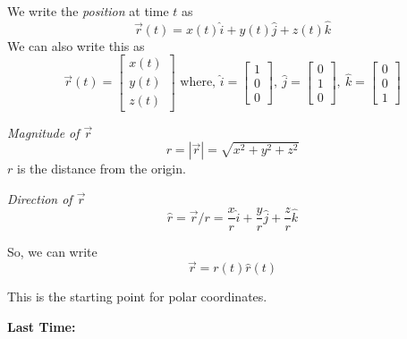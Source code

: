 \documentclass[10pt]{scrartcl}
\begin{document}
\begin{definition} We write the \emph{position} at time $t$ as
\[\vec{r}(t) = x(t)\hat{i} + y(t)\hat{j} + z(t)\hat{k}\]
We can also write this as
\[\vec{r}(t) = \left[\begin{smallmatrix}
x(t)\\ y(t) \\ z(t)	
\end{smallmatrix}
 \right]\text{ where, } \hat{i} =  \left[\begin{smallmatrix}
1\\0\\0
\end{smallmatrix}
 \right],~ \hat{j} =  \left[\begin{smallmatrix}
0\\1\\0
\end{smallmatrix}
 \right],~ \hat{k} =  \left[\begin{smallmatrix}
0\\0\\1
\end{smallmatrix}
 \right]\]
\end{definition}
\begin{definition}
 \textit{Magnitude of $\vec{r}$} \[r = |\vec{r}| = \sqrt{x^2 + y^2 + z^2}\]
$r$ is the distance from the origin.
 
 \textit{Direction of $\vec{r}$} \[\hat{r} = \vec{r}/r = \frac{x}{r}\hat{i} + \frac{y}{r}\hat{j} + \frac{z}{r}\hat{k}\]

 So, we can write 
 \[\vec{r} = r(t)\hat{r}(t)\]
 \end{definition}
\begin{note}
     This is the starting point for polar coordinates.
 \end{note}





 \textbf{Last Time:} 

\begin{center}
\end{center}
\end{document}
